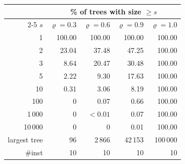 \begin{tabular}{@{}rrrrr@{}}
\toprule
 & \multicolumn{4}{c}{\% of trees with size $\ge s$} \\
\cmidrule(l){2-5}
$s$ & $\varrho=0.3$ & $\varrho=0.6$ & $\varrho=0.9$ & $\varrho=1.0$ \\
\midrule
1 & 100.00 & 100.00 & 100.00 & 100.00 \\
2 & 23.04 & 37.48 & 47.25 & 100.00 \\
3 & 8.64 & 20.47 & 30.48 & 100.00 \\
5 & 2.22 & 9.30 & 17.63 & 100.00 \\
10 & 0.31 & 3.06 & 8.19 & 100.00 \\
100 & 0 & 0.07 & 0.66 & 100.00 \\
1\,000 & 0 & $<0.01$ & 0.07 & 100.00 \\
10\,000 & 0 & 0 & 0.01 & 100.00 \\
\midrule
largest tree & 96 & 2\,866 & 42\,153 & 100\,000 \\
\#inst & 10 & 10 & 10 & 10 \\
\bottomrule
\end{tabular}
